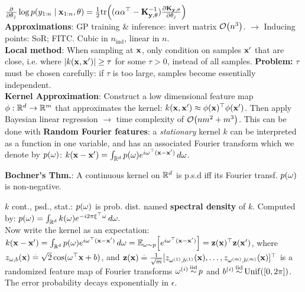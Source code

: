 {\tiny $\pdv{}{\theta_j} \log p(y_{1:n} \mid \vx_{1:n}, \vtheta) = \frac{1}{2} \tr{(\valpha \transpose{\valpha} - \inv{\mK_{\vy,\vtheta}}) \pdv{\mK_{\vy,\vtheta}}{\theta_j}}$} \\
\textbf{Approximations}: GP training \& inference: invert matrix $\BigO{n^3}$. 
$\rightarrow$ Inducing points: SoR; FITC. Cubic in $n_{\text{ind}}$, linear in $n$. \\
\textbf{Local method}: When sampling at $\mathbf{x}$, only condition on samples $\mathbf{x'}$ that are close, i.e. where $\left| k(\mathbf{x}, \mathbf{x'}) \right| \geq \tau$ for some $\tau > 0$, instead of all samples. \textbf{Problem:} $\tau$ must be chosen carefully: if $\tau$ is too large, samples become essentially independent. \\
\textbf{Kernel Approximation}: Construct a low dimensional feature map $\mathbf{\phi} : \mathbb{R}^d \to \mathbb{R}^m$ that approximates the kernel: $k(\mathbf{x}, \mathbf{x'}) \approx \mathbf{\phi}(\mathbf{x})^\top \mathbf{\phi}(\mathbf{x'})$. Then apply Bayesian linear regression $\rightarrow$ time complexity of $\BigO{n m^2 + m^3}$. This can be done with \textbf{Random Fourier features}: a \textit{stationary} kernel $k$ can be interpreted as a function in one variable, and has an associated Fourier transform which we denote by $p(\mathbf{\omega})$: $k(\mathbf{x}-\mathbf{x'}) = \int_{\mathbb{R}^d} p(\mathbf{\omega}) e^{i \mathbf{\omega}^\top (\mathbf{x}-\mathbf{x'})} \,d\mathbf{\omega}$.
\begin{framed}
    \textbf{Bochner's Thm.}: A continuous kernel on $\mathbb{R}^d$ is p.s.d iff its Fourier transf. $p(\mathbf{\omega})$ is non-negative.
\end{framed}
$k$ cont., psd., stat.: $p(\mathbf{\omega})$ is prob. dist. named \textbf{spectral density} of $k$.
Computed by: $p(\mathbf{\omega}) = \int_{\mathbb{R}^d} k(\mathbf{\omega}) e^{- i 2 \pi \mathbf{\xi}^\top \mathbf{\omega}} \,d\mathbf{\omega}.$ \\ Now write the kernel as an expectation: $k(\vx-\vxp) = \int_{\R^d} p(\vomega) e^{i \transpose{\vomega} (\vx-\vxp)} \,d\vomega = \E[\vomega \sim p]{e^{i \transpose{\vomega}(\vx-\vxp)}}= \transpose{\vz(\vx)} \vz(\vxp)$, where $z_{\mathbf{\omega},b}(\mathbf{x}) \overset{.}{=} \sqrt{2} \cos(\mathbf{\omega}^\top \mathbf{x} + b)$, and $\mathbf{z}(\mathbf{x}) \overset{.}{=} \frac{1}{\sqrt{m}} [z_{\mathbf{\omega}^{(1)},b^{(1)}}(\mathbf{x}), \dots, z_{\mathbf{\omega}^{(m)},b^{(m)}}(\mathbf{x})]^\top$ is a randomized feature map of Fourier transforms $\mathbf{\omega}^{(i)} \operatorname*{\smash{\overset{\mathrm{iid}}{\sim}}} p$ and $b^{(i)} \iid \Unif{\brackets{0, 2 \pi}}$. The error probability decays exponentially in $\epsilon$.
